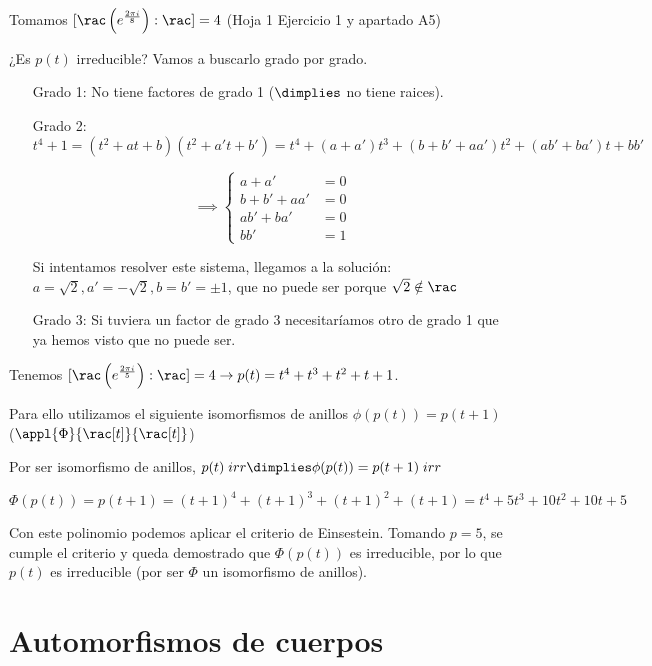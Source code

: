 \documentclass{apuntes}
\begin{document}
\begin{example}
Tomamos $[\rac\left(e^{\frac{2\pi i}{8}}\right):\rac] = 4$ (Hoja 1 Ejercicio 1 y apartado A5)

¿Es $p(t)$ irreducible? Vamos a buscarlo grado por grado.

\begin{itemize}
\item[Grado 1:] No tiene factores de grado 1 ($\dimplies$ no tiene raices).

\item[Grado 2:] $t^4+1 = (t^2 + at + b) (t^2+a't+b') = t^4 + (a+a')t^3+ (b+b'+aa') t^2 + (ab' + ba') t + bb'$

\[\implies \left\{\begin{array}{cc}
a+a' &=0\\b+b'+aa'&=0\\ab'+ba' &=0\\bb'&=1
\end{array}\right.\]

Si intentamos resolver este sistema, llegamos a la solución: $a=\sqrt{2},a'=-\sqrt{2},b=b'=\pm 1$, que no puede ser porque $\sqrt{2}\notin\rac$

\item[Grado 3:] Si tuviera un factor de grado 3 necesitaríamos otro de grado 1 que ya hemos visto que no puede ser.
\end{itemize}
\end{example}

\begin{example}[2]
\label{Teoria_H1.E1.A5.S_Af}
Tenemos $[\rac\left(e^{\frac{2\pi i}{5}}\right) : \rac]=4 \to p(t) = t^4 + t^3 + t^2 + t + 1$.

Para ello utilizamos el siguiente isomorfismos de anillos $\phi(p(t))=p(t+1)$\\ ($\appl{\Phi}{\rac[t]}{\rac[t]}$)

Por ser isomorfismo de anillos, $p(t) \;irr \dimplies \phi(p(t)) = p(t+1)\; irr$

\[\Phi(p(t)) = p(t+1) = (t+1)^4 + (t+1)^3 + (t+1)^2 + (t+1) = t^4 + 5t^3 + 10t^2 + 10t + 5\]

Con este polinomio podemos aplicar el criterio de Einsestein. Tomando $p=5$, se cumple el criterio y queda demostrado que $\Phi(p(t))$ es irreducible, por lo que $p(t)$ es irreducible (por ser $\Phi$ un isomorfismo de anillos).

\end{example}

\section{Automorfismos de cuerpos}
\end{document}

